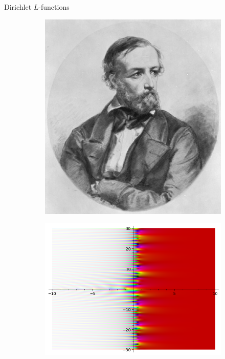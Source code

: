 \documentclass[10pt]{beamer}
\begin{document}
\begin{frame}{Dirichlet $L$-functions}
  \begin{figure}[H]
  \centering
  \begin{subfigure}[b]{0.3\textwidth}
  \centering
\includegraphics[width=.6\textwidth]{Dirichlet.jpg}
\end{subfigure}
  \begin{subfigure}[b]{0.3\textwidth}
  \centering
\includegraphics[width=\textwidth]{DirichletLfunction67.png}
\end{subfigure}
  \begin{subfigure}[b]{0.3\textwidth}
  \centering

\end{subfigure}
\end{figure}
\end{frame}
\end{document}
